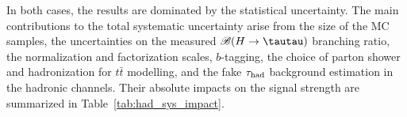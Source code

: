 In both cases, the results are dominated by the statistical uncertainty.
The main contributions to the total systematic uncertainty arise from  the size of the MC samples,
the uncertainties on the measured $\BR(H\to \tautau)$ branching ratio,
the normalization and factorization scales, $b$-tagging, the choice of parton shower and hadronization for $t\bar t$ modelling, and
the fake $\tau_{\mathrm{had}}$ background estimation in the hadronic channels. Their absolute impacts on the signal strength are summarized in Table~\ref{tab:had_sys_impact}.
